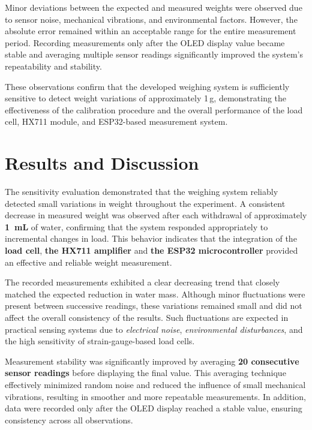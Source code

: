 Minor deviations between the expected and measured weights were observed due to sensor noise, mechanical vibrations, and environmental factors. However, the absolute error remained within an acceptable range for the entire measurement period. Recording measurements only after the OLED display value became stable and averaging multiple sensor readings significantly improved the system's repeatability and stability.

These observations confirm that the developed weighing system is sufficiently sensitive to detect weight variations of approximately 1\,g, demonstrating the effectiveness of the calibration procedure and the overall performance of the load cell, HX711 module, and ESP32-based measurement system.


\section{Results and Discussion}

The sensitivity evaluation demonstrated that the weighing system reliably detected small variations in weight throughout the experiment. A consistent decrease in measured weight was observed after each withdrawal of approximately \textbf{1~mL} of water, confirming that the system responded appropriately to incremental changes in load. This behavior indicates that the integration of the \textbf{load cell}, \textbf{the HX711 amplifier} and \textbf{the ESP32 microcontroller} provided an effective and reliable weight measurement.

The recorded measurements exhibited a clear decreasing trend that closely matched the expected reduction in water mass. Although minor fluctuations were present between successive readings, these variations remained small and did not affect the overall consistency of the results. Such fluctuations are expected in practical sensing systems due to \emph{electrical noise}, \emph{environmental disturbances}, and the high sensitivity of strain-gauge-based load cells.

Measurement stability was significantly improved by averaging \textbf{20 consecutive sensor readings} before displaying the final value. This averaging technique effectively minimized random noise and reduced the influence of small mechanical vibrations, resulting in smoother and more repeatable measurements. In addition, data were recorded only after the OLED display reached a stable value, ensuring consistency across all observations.

